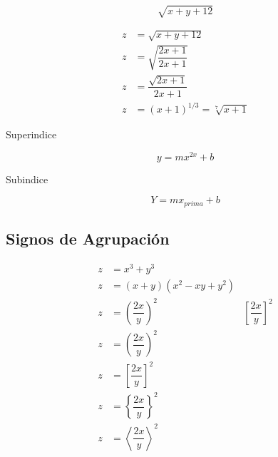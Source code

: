 \documentclass[12pt,letterpaper, onecolumn]{article}
\begin{document}
$$ \sqrt{x+y+12} $$

\begin{align*}
    z &= \sqrt{x+y+12} \\
    z &= \sqrt{ \dfrac{2x+1}{2x+1} } \\
    z &= \dfrac{ \sqrt{2x+1}}{2x+1} \\
    z &= (x+1)^{1/3} = \sqrt[7]{x+1}
\end{align*}

Superindice

$$ y=mx^{2x}+b $$

Subindice

$$ Y=mx_{prima}+b$$


\subsection{Signos de Agrupación}

\begin{align*}
    z &=x^3+y^3 \\
    z &= (x+y)(x^2-xy+y^2) \\
    z &= (\dfrac{2x}{y})^2 & [\dfrac{2x}{y}]^2 \\
    z &= \left (\dfrac{2x}{y} \right)^2 \\
    z &= \left [\dfrac{2x}{y} \right]^2 \\
    z &= \left \{ \dfrac{2x}{y} \right \}^2 \\
    z &= \left< \dfrac{2x}{y} \right> ^2
\end{align*}
\end{document}
